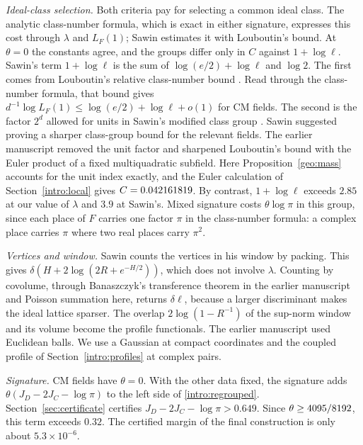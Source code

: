 \emph{Ideal-class selection.} Both criteria pay for selecting a common
ideal class. The analytic class-number formula, which is exact in either
signature, expresses this cost through $\lambda$ and $L_F(1)$; Sawin
estimates it with Louboutin's bound. At $\theta=0$ the constants agree, and the groups differ only
in $C$ against $1+\log\ell$. Sawin's term $1+\log\ell$ is the sum of
$\log(e/2)+\log\ell$ and $\log2$. The first comes from Louboutin's
relative class-number bound \cite[Corollary~3]{Louboutin2000}. Read
through the class-number formula, that bound gives
$d^{-1}\log L_F(1)\le\log(e/2)+\log\ell+o(1)$ for CM fields. The second
is the factor $2^d$ allowed for units in Sawin's modified class group
\cite[Lemma~6]{Sawin2026}. Sawin suggested proving a sharper
class-group bound for the relevant fields. The earlier manuscript
removed the unit factor and sharpened Louboutin's bound with the Euler
product of a fixed multiquadratic subfield. Here
Proposition~\ref{geo:mass} accounts for the unit index exactly, and the
Euler calculation of Section~\ref{intro:local} gives $C=0.042161819$. By
contrast, $1+\log\ell$ exceeds $2.85$ at our value of $\lambda$ and
$3.9$ at Sawin's. Mixed signature costs $\theta\log\pi$ in this group,
since each place of $F$ carries one factor $\pi$ in the class-number
formula: a complex place carries $\pi$ where two real places carry
$\pi^2$.

\emph{Vertices and window.} Sawin counts the vertices in his window by
packing. This gives $\delta(H+2\log(2R+e^{-H/2}))$, which does not
involve $\lambda$. Counting by covolume, through Banaszczyk's
transference theorem in the earlier manuscript and Poisson summation
here, returns $\delta\ell$, because a larger discriminant makes the
ideal lattice sparser. The overlap $2\log(1-R^{-1})$ of the sup-norm
window and its volume become the profile functionals. The earlier
manuscript used Euclidean balls. We use a Gaussian at compact
coordinates and the coupled profile of Section~\ref{intro:profiles} at
complex pairs.

\emph{Signature.} CM fields have $\theta=0$. With the other data fixed,
the signature adds $\theta(J_D-2J_C-\log\pi)$ to the left side of
\eqref{intro:regrouped}. Section~\ref{sec:certificate} certifies
$J_D-2J_C-\log\pi>0.649$. Since $\theta\ge4095/8192$, this term
exceeds $0.32$. The certified margin of the final construction is only
about $5.3\times10^{-6}$.

